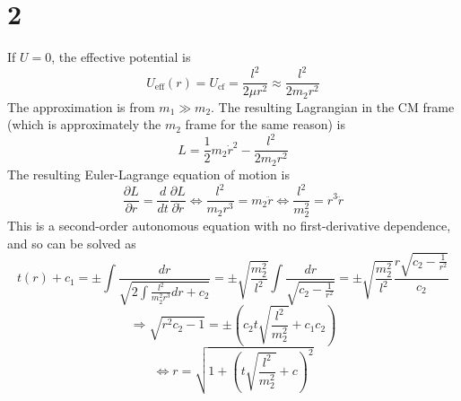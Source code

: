 \documentclass{article}
\begin{document}
\section*{2}
If $U=0$, the effective potential is
\[U_{\textrm{eff}}(r)=U_{\textrm{cf}}=\frac{l^2}{2\mu r^2}\approx \frac{l^2}{2m_2 r^2}\]
The approximation is from $m_1\gg m_2$. The resulting Lagrangian in the CM frame (which is approximately the $m_2$ frame for the same reason) is
\[L=\frac{1}{2}m_2\dot{r}^2-\frac{l^2}{2m_2 r^2}\]
The resulting Euler-Lagrange equation of motion is
\[\frac{\partial L}{\partial r}=\frac{d}{dt}\frac{\partial L}{\partial \dot{r}}\Leftrightarrow \frac{l^2}{m_2 r^3}=m_2\ddot{r}\Leftrightarrow \frac{l^2}{m_2^2}=r^3\ddot{r}\]
This is a second-order autonomous equation with no first-derivative dependence, and so can be solved as
\[t(r)+c_1=\pm\int\frac{dr}{\sqrt{2\int\frac{l^2}{m_2^2 r^3}dr+c_2}}=\pm\sqrt{\frac{m_2^2}{l^2}}\int\frac{dr}{\sqrt{c_2-\frac{1}{r^2}}}=\pm\sqrt{\frac{m_2^2}{l^2}}\frac{r\sqrt{c_2-\frac{1}{r^2}}}{c_2}\]
\[\Rightarrow \sqrt{r^2c_2-{1}}=\pm\left(c_2t\sqrt{\frac{l^2}{m_2^2}}+c_1c_2\right)\]
\[\Leftrightarrow r=\sqrt{1+\left( t\sqrt{\frac{l^2}{m_2^2}}+c \right)^2}\]
\end{document}
